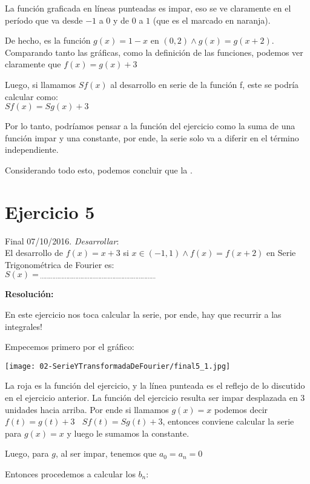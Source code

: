 \documentclass[11pt]{article}
\begin{document}
	La función graficada en líneas punteadas es impar, eso se ve claramente en el período que va desde $-1$ a $0$ y de $0$ a $1$ (que es el marcado en naranja). 
	
	De hecho, es la función $g(x)=1-x$ en $(0,2) \wedge g(x)=g(x+2)$. Comparando tanto las gráficas, como la definición de las funciones, podemos ver claramente que $f(x)=g(x) + 3$
	
	Luego, si llamamos $Sf(x)$ al desarrollo en serie de la función f, este se podría calcular como:\\ $Sf(x)=Sg(x)+3$
	
	Por lo tanto, podríamos pensar a la función del ejercicio como la suma de una función impar y una constante, por ende, la serie solo va a diferir en el término independiente.
	
	Considerando todo esto, podemos concluir que la .
	\section{Ejercicio 5}
	Final 07/10/2016. \textit{Desarrollar}:\\
	El desarrollo de $f(x)=x+3$ si $x\in(-1,1)\wedge f(x)=f(x+2)$ en Serie Trigonométrica de Fourier es:\\
	$S(x)=_{\;\cdots\cdots\cdots\cdots\cdots\cdots\cdots\cdots\cdots\cdots\cdots\cdots\cdots\cdots\cdots\cdots\cdots\cdots\cdots\cdots\cdots\cdots\cdots\cdots\cdots}$
	
	\textbf{Resolución:}
	
	En este ejercicio nos toca calcular la serie, por ende, hay que recurrir a las integrales!
	
	Empecemos primero por el gráfico:
	\begin{center}
		\texttt{[image: 02-SerieYTransformadaDeFourier/final5\_1.jpg]}
	\end{center}

	La roja es la función del ejercicio, y la línea punteada es el reflejo de lo discutido en el ejercicio anterior. La función del ejercicio resulta ser impar desplazada en 3 unidades hacia arriba. Por ende si llamamos $g(x)=x$ podemos decir $f(t)=g(t)+3\;$ \textrightarrow $\;Sf(t)=Sg(t)+3$, entonces conviene calcular la serie para $g(x)=x$ y luego le sumamos la constante.
	
	Luego, para $g$, al ser impar, tenemos que $a_{0}=a_{n}=0$
	
	Entonces procedemos a calcular los $b_{n}$:
	
\end{document}
